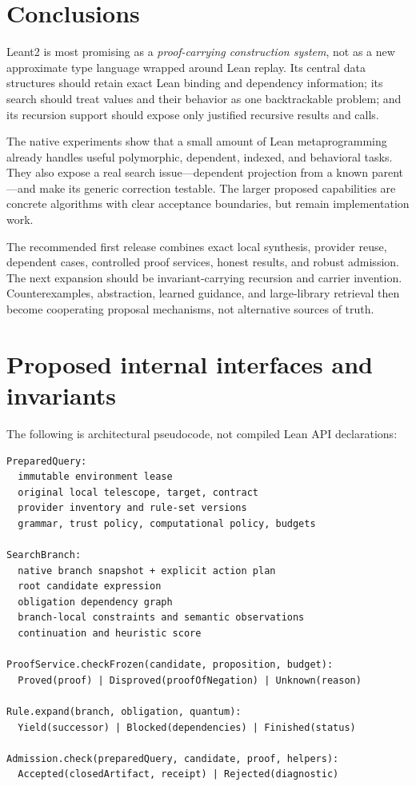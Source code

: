 \documentclass[11pt,letterpaper]{article}
\theoremstyle{definition}\newtheorem{definition}[theorem]{Definition}
\theoremstyle{remark}\newtheorem{remark}[theorem]{Remark}
\begin{document}
\section{Conclusions}

Leant2 is most promising as a \emph{proof-carrying construction system}, not as
a new approximate type language wrapped around Lean replay. Its central data
structures should retain exact Lean binding and dependency information; its
search should treat values and their behavior as one backtrackable problem; and
its recursion support should expose only justified recursive results and calls.

The native experiments show that a small amount of Lean metaprogramming already
handles useful polymorphic, dependent, indexed, and behavioral tasks. They also
expose a real search issue---dependent projection from a known parent---and make
its generic correction testable. The larger proposed capabilities are concrete
algorithms with clear acceptance boundaries, but remain implementation work.

The recommended first release combines exact local synthesis, provider reuse,
dependent cases, controlled proof services, honest results, and robust admission.
The next expansion should be invariant-carrying recursion and carrier invention.
Counterexamples, abstraction, learned guidance, and large-library retrieval then
become cooperating proposal mechanisms, not alternative sources of truth.

\appendix
\section{Proposed internal interfaces and invariants}
\label{app:interfaces}

The following is architectural pseudocode, not compiled Lean API declarations:
\begin{lstlisting}[language={}]
PreparedQuery:
  immutable environment lease
  original local telescope, target, contract
  provider inventory and rule-set versions
  grammar, trust policy, computational policy, budgets

SearchBranch:
  native branch snapshot + explicit action plan
  root candidate expression
  obligation dependency graph
  branch-local constraints and semantic observations
  continuation and heuristic score

ProofService.checkFrozen(candidate, proposition, budget):
  Proved(proof) | Disproved(proofOfNegation) | Unknown(reason)

Rule.expand(branch, obligation, quantum):
  Yield(successor) | Blocked(dependencies) | Finished(status)

Admission.check(preparedQuery, candidate, proof, helpers):
  Accepted(closedArtifact, receipt) | Rejected(diagnostic)
\end{lstlisting}
\end{document}
